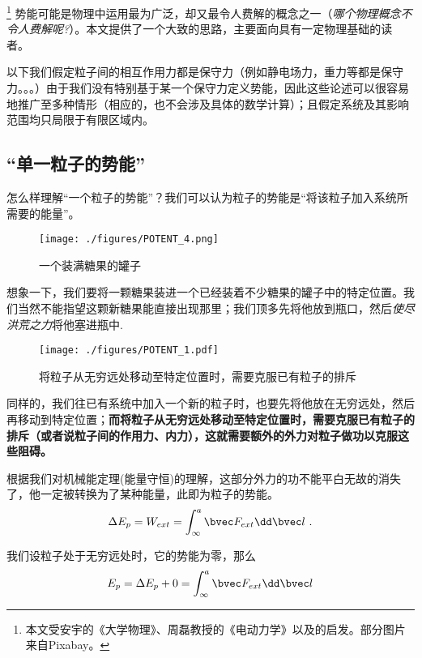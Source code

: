 

\begin{issues}
\issueDraft
\end{issues}

\footnote{本文受安宇的《大学物理》、周磊教授的《电动力学》以及\cite{GriffE}的启发。部分图片来自Pixabay。} 势能可能是物理中运用最为广泛，却又最令人费解的概念之一（\textsl{哪个物理概念不令人费解呢?}）。本文提供了一个大致的思路，主要面向具有一定物理基础的读者。

以下我们假定粒子间的相互作用力都是保守力（例如静电场力，重力等都是保守力。。。）由于我们没有特别基于某一个保守力定义势能，因此这些论述可以很容易地推广至多种情形（相应的，也不会涉及具体的数学计算）；且假定系统及其影响范围均只局限于有限区域内。

\subsection{“单一粒子的势能”}
怎么样理解“一个粒子的势能”？我们可以认为粒子的势能是“将该粒子加入系统所需要的能量”。
\begin{figure}[ht]
\centering
\texttt{[image: ./figures/POTENT\_4.png]}
\caption{一个装满糖果的罐子} \label{POTENT_fig4}
\end{figure}
想象一下，我们要将一颗糖果装进一个已经装着不少糖果的罐子中的特定位置。我们当然不能指望这颗新糖果能直接出现那里；我们顶多先将他放到瓶口，然后\textsl{使尽洪荒之力}将他塞进瓶中.

\begin{figure}[ht]
\centering
\texttt{[image: ./figures/POTENT\_1.pdf]}
\caption{将粒子从无穷远处移动至特定位置时，需要克服已有粒子的排斥} \label{POTENT_fig1}
\end{figure}

同样的，我们往已有系统中加入一个新的粒子时，也要先将他放在无穷远处，然后再移动到特定位置；\textbf{而将粒子从无穷远处移动至特定位置时，需要克服已有粒子的排斥（或者说粒子间的作用力、内力），这就需要额外的外力对粒子做功以克服这些阻碍。}

根据我们对机械能定理(能量守恒)的理解，这部分外力的功不能平白无故的消失了，他一定被转换为了某种能量，此即为粒子的势能。
$$\Delta E_p = W_{ext}=\int^a_\infty \bvec F_{ext} \dd \bvec l~. $$

我们设粒子处于无穷远处时，它的势能为零，那么
$$E_p = \Delta E_p + 0 = \int^a_\infty \bvec F_{ext} \dd \bvec l$$

